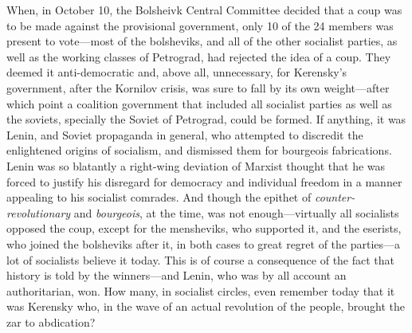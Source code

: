 \documentclass[a4paper]{article}
\begin{document}
When, in October 10, the Bolsheivk Central Committee decided that a coup was to
be made against the provisional government, only 10 of the 24 members was
present to vote---most of the bolsheviks, and all of the other socialist
parties, as well as the working classes of Petrograd, had rejected the idea of a
coup. They deemed it anti-democratic and, above all, unnecessary, for Kerensky's
government, after the Kornilov crisis, was sure to fall by its own
weight---after which point a coalition government that included all socialist
parties as well as the soviets, specially the Soviet of Petrograd, could be
formed. If anything, it was Lenin, and Soviet propaganda in general, who
attempted to discredit the enlightened origins of socialism, and dismissed them
for bourgeois fabrications. Lenin was so blatantly a right-wing deviation of
Marxist thought that he was forced to justify his disregard for democracy and
individual freedom in a manner appealing to his socialist comrades. And though
the epithet of \textit{counter-revolutionary} and \textit{bourgeois}, at the
time, was not enough---virtually all socialists opposed the coup, except for the
mensheviks, who supported it, and the eserists, who joined the bolsheviks after
it, in both cases to great regret of the parties---a lot of socialists believe
it today. This is of course a consequence of the fact that history is told by
the winners---and Lenin, who was by all account an authoritarian, won. How many,
in socialist circles, even remember today that it was Kerensky who, in the wave
of an actual revolution of the people, brought the zar to abdication?




    
\end{document}
